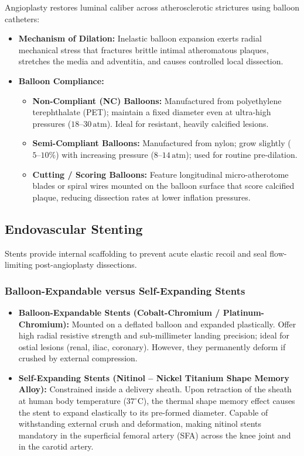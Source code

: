 \documentclass[11pt,a4paper]{article}
\begin{document}
Angioplasty restores luminal caliber across atherosclerotic strictures using balloon catheters:
\begin{itemize}[leftmargin=*]
    \item \textbf{Mechanism of Dilation:} Inelastic balloon expansion exerts radial mechanical stress that fractures brittle intimal atheromatous plaques, stretches the media and adventitia, and causes controlled local dissection.
    \item \textbf{Balloon Compliance:}
    \begin{itemize}
        \item \textbf{Non-Compliant (NC) Balloons:} Manufactured from polyethylene terephthalate (PET); maintain a fixed diameter even at ultra-high pressures ($18\text{--}30\,\text{atm}$). Ideal for resistant, heavily calcified lesions.
        \item \textbf{Semi-Compliant Balloons:} Manufactured from nylon; grow slightly ($5\text{--}10\%$) with increasing pressure ($8\text{--}14\,\text{atm}$); used for routine pre-dilation.
        \item \textbf{Cutting / Scoring Balloons:} Feature longitudinal micro-atherotome blades or spiral wires mounted on the balloon surface that score calcified plaque, reducing dissection rates at lower inflation pressures.
    \end{itemize}
\end{itemize}

\subsection{Endovascular Stenting}

Stents provide internal scaffolding to prevent acute elastic recoil and seal flow-limiting post-angioplasty dissections.

\subsubsection{Balloon-Expandable versus Self-Expanding Stents}
\begin{itemize}[leftmargin=*]
    \item \textbf{Balloon-Expandable Stents (Cobalt-Chromium / Platinum-Chromium):} Mounted on a deflated balloon and expanded plastically. Offer high radial resistive strength and sub-millimeter landing precision; ideal for ostial lesions (renal, iliac, coronary). However, they permanently deform if crushed by external compression.
    \item \textbf{Self-Expanding Stents (Nitinol -- Nickel Titanium Shape Memory Alloy):} Constrained inside a delivery sheath. Upon retraction of the sheath at human body temperature ($37^\circ\text{C}$), the thermal shape memory effect causes the stent to expand elastically to its pre-formed diameter. Capable of withstanding external crush and deformation, making nitinol stents mandatory in the superficial femoral artery (SFA) across the knee joint and in the carotid artery.
\end{itemize}
\end{document}
